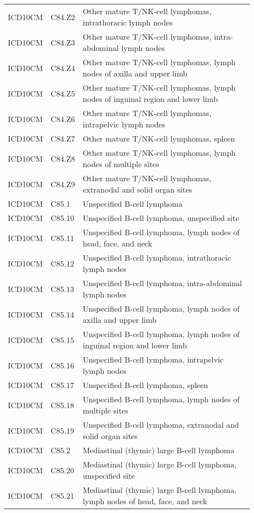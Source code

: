 \begin{longtable}{p{}p{}p{}}
  ICD10CM & C84.Z2 & Other mature T/NK-cell lymphomas, intrathoracic lymph nodes \\ 
  ICD10CM & C84.Z3 & Other mature T/NK-cell lymphomas, intra-abdominal lymph nodes \\ 
  ICD10CM & C84.Z4 & Other mature T/NK-cell lymphomas, lymph nodes of axilla and upper limb \\ 
  ICD10CM & C84.Z5 & Other mature T/NK-cell lymphomas, lymph nodes of inguinal region and lower limb \\ 
  ICD10CM & C84.Z6 & Other mature T/NK-cell lymphomas, intrapelvic lymph nodes \\ 
  ICD10CM & C84.Z7 & Other mature T/NK-cell lymphomas, spleen \\ 
  ICD10CM & C84.Z8 & Other mature T/NK-cell lymphomas, lymph nodes of multiple sites \\ 
  ICD10CM & C84.Z9 & Other mature T/NK-cell lymphomas, extranodal and solid organ sites \\ 
  ICD10CM & C85.1 & Unspecified B-cell lymphoma \\ 
  ICD10CM & C85.10 & Unspecified B-cell lymphoma, unspecified site \\ 
  ICD10CM & C85.11 & Unspecified B-cell lymphoma, lymph nodes of head, face, and neck \\ 
  ICD10CM & C85.12 & Unspecified B-cell lymphoma, intrathoracic lymph nodes \\ 
  ICD10CM & C85.13 & Unspecified B-cell lymphoma, intra-abdominal lymph nodes \\ 
  ICD10CM & C85.14 & Unspecified B-cell lymphoma, lymph nodes of axilla and upper limb \\ 
  ICD10CM & C85.15 & Unspecified B-cell lymphoma, lymph nodes of inguinal region and lower limb \\ 
  ICD10CM & C85.16 & Unspecified B-cell lymphoma, intrapelvic lymph nodes \\ 
  ICD10CM & C85.17 & Unspecified B-cell lymphoma, spleen \\ 
  ICD10CM & C85.18 & Unspecified B-cell lymphoma, lymph nodes of multiple sites \\ 
  ICD10CM & C85.19 & Unspecified B-cell lymphoma, extranodal and solid organ sites \\ 
  ICD10CM & C85.2 & Mediastinal (thymic) large B-cell lymphoma \\ 
  ICD10CM & C85.20 & Mediastinal (thymic) large B-cell lymphoma, unspecified site \\ 
  ICD10CM & C85.21 & Mediastinal (thymic) large B-cell lymphoma, lymph nodes of head, face, and neck \\ 

\end{longtable}

